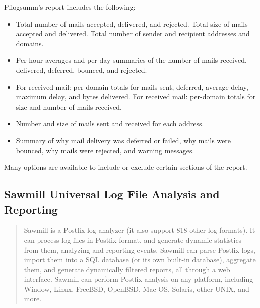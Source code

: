 Pflogsumm's report includes the following:

\begin{itemize}

    \item Total number of mails accepted, delivered, and rejected.  Total
        size of mails accepted and delivered.  Total number of sender and
        recipient addresses and domains.

    \item Per-hour averages and per-day summaries of the number of mails
        received, delivered, deferred, bounced, and rejected.

    \item For received mail: per-domain totals for mails sent, deferred,
        average delay, maximum delay, and bytes delivered.  For received
        mail: per-domain totals for size and number of mails received.

    \item Number and size of mails sent and received for each address.

    \item Summary of why mail delivery was deferred or failed, why mails
        were bounced, why mails were rejected, and warning messages.

\end{itemize}

Many options are available to include or exclude certain sections of the
report.

\subsection{Sawmill Universal Log File Analysis and Reporting}

\begin{quotation}

    Sawmill is a Postfix log analyzer (it also support 818 other log
    formats). It can process log files in Postfix format, and generate
    dynamic statistics from them, analyzing and reporting events. Sawmill
    can parse Postfix logs, import them into a SQL database (or its own
    built-in database), aggregate them, and generate dynamically filtered
    reports, all through a web interface. Sawmill can perform Postfix
    analysis on any platform, including Window, Linux, FreeBSD, OpenBSD,
    Mac OS, Solaris, other UNIX, and more.

\end{quotation}

